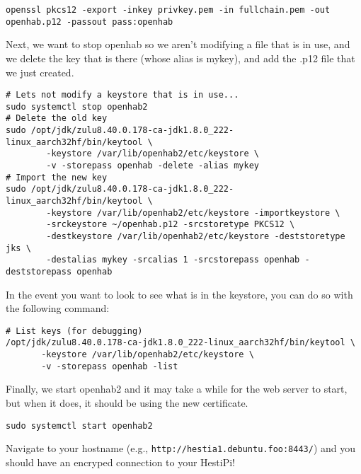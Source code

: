 \begin{verbatim}
openssl pkcs12 -export -inkey privkey.pem -in fullchain.pem -out openhab.p12 -passout pass:openhab
\end{verbatim}

Next, we want to stop openhab so we aren't modifying a file that is in use, and
we delete the key that is there (whose alias is mykey), and add the .p12 file
that we just created.

\begin{verbatim}
# Lets not modify a keystore that is in use...
sudo systemctl stop openhab2
# Delete the old key
sudo /opt/jdk/zulu8.40.0.178-ca-jdk1.8.0_222-linux_aarch32hf/bin/keytool \
        -keystore /var/lib/openhab2/etc/keystore \
        -v -storepass openhab -delete -alias mykey
# Import the new key
sudo /opt/jdk/zulu8.40.0.178-ca-jdk1.8.0_222-linux_aarch32hf/bin/keytool \
        -keystore /var/lib/openhab2/etc/keystore -importkeystore \
        -srckeystore ~/openhab.p12 -srcstoretype PKCS12 \
        -destkeystore /var/lib/openhab2/etc/keystore -deststoretype jks \
        -destalias mykey -srcalias 1 -srcstorepass openhab -deststorepass openhab
\end{verbatim}

In the event you want to look to see what is in the keystore, you can do so
with the following command:

\begin{verbatim}
# List keys (for debugging)
/opt/jdk/zulu8.40.0.178-ca-jdk1.8.0_222-linux_aarch32hf/bin/keytool \
       -keystore /var/lib/openhab2/etc/keystore \
       -v -storepass openhab -list
\end{verbatim}

Finally, we start openhab2 and it may take a while for the web server to start,
but when it does, it should be using the new certificate.

\begin{verbatim}
sudo systemctl start openhab2
\end{verbatim}

Navigate to your hostname (e.g., \texttt{http://hestia1.debuntu.foo:8443/}) and
you should have an encryped connection to your HestiPi!

